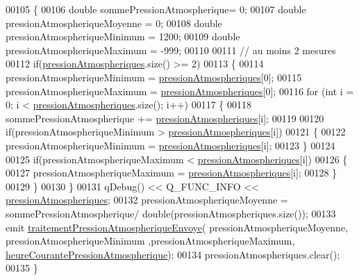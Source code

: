 \begin{DoxyCode}
00105 \{
00106     \textcolor{keywordtype}{double} sommePressionAtmospherique= 0;
00107     \textcolor{keywordtype}{double} pressionAtmospheriqueMoyenne = 0;
00108     \textcolor{keywordtype}{double} pressionAtmospheriqueMinimum = 1200;
00109     \textcolor{keywordtype}{double} pressionAtmospheriqueMaximum = -999;
00110 
00111     \textcolor{comment}{// au moins 2 mesures}
00112     \textcolor{keywordflow}{if}(\hyperlink{class_infos_pression_atmospherique_a38218b11dc9fb22aca7525f93155a26c}{pressionAtmospheriques}.size() >= 2)
00113     \{
00114         pressionAtmospheriqueMinimum = \hyperlink{class_infos_pression_atmospherique_a38218b11dc9fb22aca7525f93155a26c}{pressionAtmospheriques}[0];
00115         pressionAtmospheriqueMaximum = \hyperlink{class_infos_pression_atmospherique_a38218b11dc9fb22aca7525f93155a26c}{pressionAtmospheriques}[0];
00116         \textcolor{keywordflow}{for} (\textcolor{keywordtype}{int} i = 0; i < \hyperlink{class_infos_pression_atmospherique_a38218b11dc9fb22aca7525f93155a26c}{pressionAtmospheriques}.size(); i++)
00117         \{
00118             sommePressionAtmospherique += \hyperlink{class_infos_pression_atmospherique_a38218b11dc9fb22aca7525f93155a26c}{pressionAtmospheriques}[i];
00119 
00120             \textcolor{keywordflow}{if}(pressionAtmospheriqueMinimum > \hyperlink{class_infos_pression_atmospherique_a38218b11dc9fb22aca7525f93155a26c}{pressionAtmospheriques}[i])
00121             \{
00122                 pressionAtmospheriqueMinimum = \hyperlink{class_infos_pression_atmospherique_a38218b11dc9fb22aca7525f93155a26c}{pressionAtmospheriques}[i];
00123             \}
00124 
00125             \textcolor{keywordflow}{if}(pressionAtmospheriqueMaximum < \hyperlink{class_infos_pression_atmospherique_a38218b11dc9fb22aca7525f93155a26c}{pressionAtmospheriques}[i])
00126             \{
00127                 pressionAtmospheriqueMaximum = \hyperlink{class_infos_pression_atmospherique_a38218b11dc9fb22aca7525f93155a26c}{pressionAtmospheriques}[i];
00128             \}
00129         \}
00130     \}
00131     qDebug() << Q\_FUNC\_INFO << \hyperlink{class_infos_pression_atmospherique_a38218b11dc9fb22aca7525f93155a26c}{pressionAtmospheriques};
00132     pressionAtmospheriqueMoyenne = sommePressionAtmospherique/ double(pressionAtmospheriques.size());
00133     emit \hyperlink{class_infos_pression_atmospherique_af759842c05a1e59b56d433e823bee341}{traitementPressionAtmospheriqueEnvoye}(
      pressionAtmospheriqueMoyenne, pressionAtmospheriqueMinimum ,pressionAtmospheriqueMaximum, 
      \hyperlink{class_infos_pression_atmospherique_ab3fa5c89841cf03f371ef7848b8bc958}{heureCourantePressionAtmospherique});
00134     pressionAtmospheriques.clear();
00135 \}
\end{DoxyCode}
\mbox{\label{class_infos_pression_atmospherique_a6836dfc16f1be4287354ea26a080b436}} 
